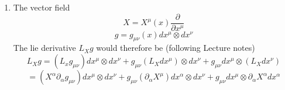 \documentclass[12pt]{article}
\begin{document}
\begin{enumerate}
\begin{enumerate}
    \end{enumerate}

    \item The vector field 
    $$ X = X^{\mu} (x) \frac{\partial}{\partial x^{\mu}} $$
    $$ g = g_{\mu \nu} (x) d x^{\mu} \otimes dx^{\nu} $$
    The lie derivative $L_X g$ would therefore be (following Lecture notes) 
    $$ L_X g = (L_x g_{\mu \nu} ) dx^{\mu} \otimes dx^{\nu} + g_{\mu \nu} ( L_X dx^{\mu} ) \otimes dx^{\nu} + g_{\mu \nu} dx^{\mu} \otimes (L_X dx^{\nu} ) $$
    $$ = ( X^{\alpha} \partial_{\alpha} g_{\mu \nu} ) dx^{\mu} \otimes dx^{\nu} + g_{\mu \nu} ( \partial_{\alpha} X^{\mu} ) dx^{\alpha} \otimes dx^{\nu} + g_{\mu \nu} dx^{\mu} \otimes \partial_{\alpha} X^{\alpha} dx^{\alpha} $$
    

\end{enumerate}
\end{document}
